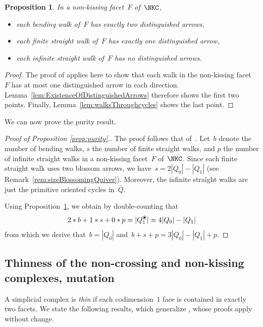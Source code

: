 \documentclass{amsart}
\newtheorem{proposition}[theorem]{Proposition}
\theoremstyle{definition}
\newcommand{\darkblue}{\color{darkblue}} %
\newcommand{\defn}[1]{\textsl{\darkblue #1}} %
\newcommand{\blossom}{^\text{\ding{96}}} %
\begin{document}
\begin{proposition}
\label{prop:numberOfDistinguishedArrows}
In a non-kissing facet~$F$ of~$\NKC$,
\begin{itemize}
\item each bending walk of~$F$ has exactly two distinguished arrows,
\item each finite straight walk of~$F$ has exactly one distinguished arrow,
\item each infinite straight walk of~$F$ has no distinguished arrows.
\end{itemize}
\end{proposition}

\begin{proof}
The proof of \cite[Prop.~2.28]{PaluPilaudPlamondon} applies here to show that each walk in the non-kissing facet~$F$ has at most one distinguished arrow in each direction.
Lemma~\ref{lem:ExistenceOfDistinguishedArrows} therefore shows the first two points.
Finally, Lemma~\ref{lem:walksThroughcycles} shows the last point.
\end{proof}

We can now prove the purity result.

\begin{proof}[Proof of Proposition \ref{prop:purity}.]
The proof follows that of~\cite[Cor.~2.29]{PaluPilaudPlamondon}.
Let~$b$ denote the number of bending walks, $s$ the number of finite straight walks, and $p$ the number of infinite straight walks in a non-kissing facet~$F$ of~$\NKC$.
Since each finite straight walk uses two blossom arrows, we have~$s = 2|Q_0|-|Q_1|$ (see Remark~\ref{rem:sizeBlossomingQuiver}).
Moreover, the infinite straight walks are just the primitive oriented cycles in~$\bar Q$.

Using Proposition~\ref{prop:numberOfDistinguishedArrows}, we obtain by double-counting that
\[
2 * b + 1 * s + 0 * p= |Q_1\blossom| = 4|Q_0|-|Q_1|
\]
from which we derive that~$b = |Q_0|$ and~$b+s+p = 3|Q_0|-|Q_1|+p$.
\end{proof}

\subsection{Thinness of the non-crossing and non-kissing complexes, mutation}

A simplicial complex is \defn{thin} if each codimension~$1$ face is contained in exactly two facets.
We state the following results, which generalize \cite[Prop.~2.33 \& Cor.~2.35]{PaluPilaudPlamondon}, whose proofs apply without change.
\end{document}
